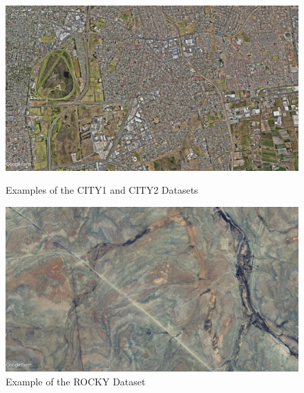\begin{figure}[H]
    \centering
    \begin{minipage}{0.45\textwidth}
        \centering
        \includegraphics[width=\textwidth]{./Chapter 4/DEMODATASETS/CITY1.jpg}
        \caption{Examples of the CITY1 and CITY2 Datasets}
        \label{fig:CITY12}
    \end{minipage}\hfill
    \begin{minipage}{0.45\textwidth}
        \centering
        \includegraphics[width=\textwidth]{./Chapter 4/DEMODATASETS/ROCKY.jpg}
        \caption{Example of the ROCKY Dataset}
        \label{fig:ROCKY}
    \end{minipage}
    
    \vspace{0.5cm} %
    

\end{figure}
